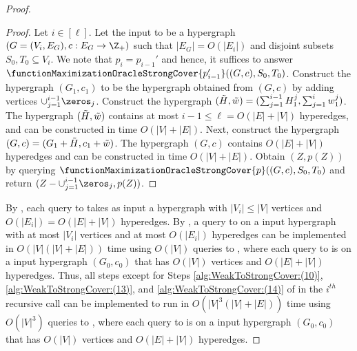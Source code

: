 \begin{proof}
\begin{proof}
Let $i\in [\ell]$. Let the input to  be a hypergraph $(G = (V_i, E_G), c:E_G\rightarrow\Z_+)$ such that $|E_G| = O(|E_i|)$ and disjoint subsets $S_0, T_0\subseteq V_i$. 
We note that $p_i=p_{i-1}'$ and hence, it suffices to answer $\functionMaximizationOracleStrongCover{p_{i-1}'}((G, c), S_0, T_0)$. 
Construct the hypergraph $(G_1, c_1)$ to be the hypergraph obtained from $(G,c)$ by adding vertices $\cup_{j=1}^{i-1}\zeros_{j}$. 
Construct the hypergraph $(\Tilde{H}, \Tilde{w})=(\sum_{j=1}^{i-1}H_1^j, \sum_{j=1}^i w_1^j)$. The hypergraph $(\Tilde{H}, \Tilde{w})$ contains at most $i - 1 \leq \ell = O(|E| + |V|)$ hyperedges, and can be constructed in time $O(|V|+|E|)$. 
Next, construct the hypergraph $(G, c)=(G_1+\Tilde{H}, c_1+\Tilde{w})$. The hypergraph $(G, c)$ contains $O(|E|+|V|)$ hyperedges and can be constructed in time $O(|V|+|E|)$. 
Obtain $(Z, p(Z))$ by querying $\functionMaximizationOracleStrongCover{p}((G, c), S_0, T_0)$ and return $(Z-\cup_{j=1}^{i-1}\zeros_{j}, p(Z))$. 
\end{proof}

By , each query to  takes as input a hypergraph with $|V_i|\le |V|$ vertices and $O(|E_i|) = O(|E|+|V|)$ hyperedges. 
By , a query to  on a input hypergraph with at most $|V_i|$ vertices and at most $O(|E_i|)$ hyperedges 
can be implemented in $O(|V|(|V| + |E|))$  time using $O(|V|)$ queries to , where each query to  is on a input hypergraph $(G_0, c_0)$ that has $O(|V|)$ vertices and $O(|E|+|V|)$ hyperedges. 
Thus, all steps except for Steps \ref{alg:WeakToStrongCover:(10)}, \ref{alg:WeakToStrongCover:(13)}, and \ref{alg:WeakToStrongCover:(14)} of  in the $i^{th}$ recursive call can be implemented to run in $O(|V|^3(|V| + |E|))$ time using $O(|V|^3)$ queries to , where each query to  is on a input hypergraph $(G_0, c_0)$ that has $O(|V|)$ vertices and $O(|E|+|V|)$ hyperedges. 


\end{proof}
